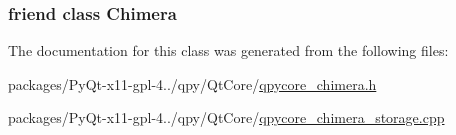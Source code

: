 \subsubsection[{Chimera}]{\setlength{\rightskip}{0pt plus 5cm}friend class {\bf Chimera}\hspace{0.3cm}{\ttfamily [friend]}}\label{classChimera_1_1Storage_aab9d11120eae38575cb2547320f39ed5}


The documentation for this class was generated from the following files\+:\begin{DoxyCompactItemize}
\item 
packages/\+Py\+Qt-\/x11-\/gpl-\/4../qpy/\+Qt\+Core/\hyperlink{qpycore__chimera_8h}{qpycore\+\_\+chimera.\+h}\item 
packages/\+Py\+Qt-\/x11-\/gpl-\/4../qpy/\+Qt\+Core/\hyperlink{qpycore__chimera__storage_8cpp}{qpycore\+\_\+chimera\+\_\+storage.\+cpp}\end{DoxyCompactItemize}
